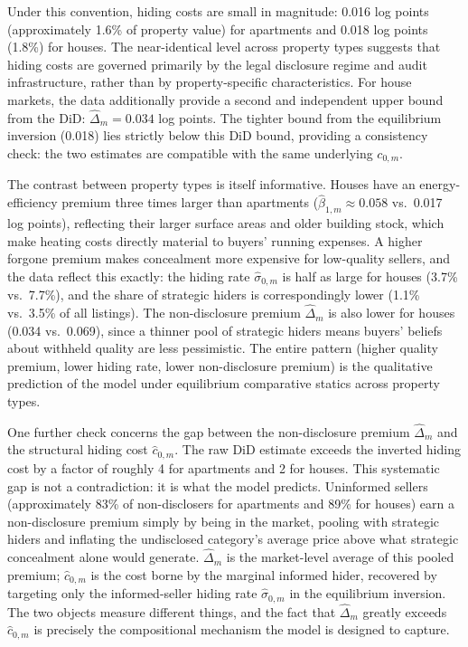 \documentclass[10pt,letterpaper]{bp-template-concise}
\begin{document}
Under this convention, hiding costs are small in magnitude: 0.016 log points (approximately 1.6\% of property value) for apartments and 0.018 log points (1.8\%) for houses. The near-identical level across property types suggests that hiding costs are governed primarily by the legal disclosure regime and audit infrastructure, rather than by property-specific characteristics. For house markets, the data additionally provide a second and independent upper bound from the DiD: $\hat\Delta_m = 0.034$ log points. The tighter bound from the equilibrium inversion (0.018) lies strictly below this DiD bound, providing a consistency check: the two estimates are compatible with the same underlying $c_{0,m}$.

The contrast between property types is itself informative. Houses have an energy-efficiency premium three times larger than apartments ($\hat\beta_{1,m} \approx 0.058$ vs.\ 0.017 log points), reflecting their larger surface areas and older building stock, which make heating costs directly material to buyers' running expenses. A higher forgone premium makes concealment more expensive for low-quality sellers, and the data reflect this exactly: the hiding rate $\hat\sigma_{0,m}$ is half as large for houses (3.7\% vs.\ 7.7\%), and the share of strategic hiders is correspondingly lower (1.1\% vs.\ 3.5\% of all listings). The non-disclosure premium $\hat\Delta_m$ is also lower for houses (0.034 vs.\ 0.069), since a thinner pool of strategic hiders means buyers' beliefs about withheld quality are less pessimistic. The entire pattern (higher quality premium, lower hiding rate, lower non-disclosure premium) is the qualitative prediction of the model under equilibrium comparative statics across property types.

One further check concerns the gap between the non-disclosure premium $\hat\Delta_m$ and the structural hiding cost $\hat{c}_{0,m}$. The raw DiD estimate exceeds the inverted hiding cost by a factor of roughly 4 for apartments and 2 for houses. This systematic gap is not a contradiction: it is what the model predicts. Uninformed sellers (approximately 83\% of non-disclosers for apartments and 89\% for houses) earn a non-disclosure premium simply by being in the market, pooling with strategic hiders and inflating the undisclosed category's average price above what strategic concealment alone would generate. $\hat\Delta_m$ is the market-level average of this pooled premium; $\hat{c}_{0,m}$ is the cost borne by the marginal informed hider, recovered by targeting only the informed-seller hiding rate $\hat\sigma_{0,m}$ in the equilibrium inversion. The two objects measure different things, and the fact that $\hat\Delta_m$ greatly exceeds $\hat{c}_{0,m}$ is precisely the compositional mechanism the model is designed to capture.
\end{document}
